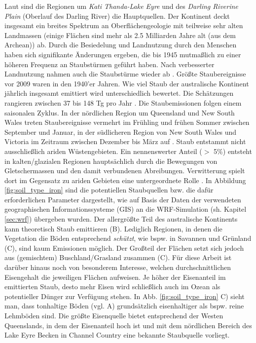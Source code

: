 \documentclass[12pt,a4paper,onecolumn,headheight=30pt]{scrartcl}
\begin{document}
Laut \citet{Deckker.2019} sind die Regionen um \textit{Kati Thanda-Lake Eyre} und des \textit{Darling Riverine Plain} (Oberlauf des Darling River) die Hauptquellen. Der Kontinent deckt insgesamt ein breites Spektrum an Oberflächengeologie mit teilweise sehr alten Landmassen (einige Flächen sind mehr als 2.5 Milliarden Jahre alt (aus dem Archean)) ab. Durch die Besiedelung und Landnutzung durch den Menschen haben sich signifikante Änderungen ergeben, die bis 1945 mutmaßlich zu einer höheren Frequenz an Staubstürmen geführt haben. Nach verbesserter Landnutzung nahmen auch die Staubstürme wieder ab \citep{Deckker.2019}. Größte Staubereignisse vor 2009 waren in den 1940'er Jahren. Wie viel Staub der australische Kontinent jährlich insgesamt emittiert wird unterschiedlich bewertet. Die Schätzungen rangieren zwischen 37 bis 148 Tg pro Jahr \citep{Shao.2011}. Die Staubemissionen folgen einem saisonalen Zyklus. In der nördlichen Region um Queensland und New South Wales treten Staubereignisse vermehrt im Frühling und frühen Sommer zwischen September und Januar, in der südlicheren Region von New South Wales und Victoria im Zeitraum zwischen Dezember bis März auf \citep{Deckker.2019}. Staub entstammt nicht ausschließlich ariden Wüstengebieten. Ein nennenswerter Anteil ($>$ 5\%) entsteht in kalten/glazialen Regionen hauptsächlich durch die Bewegungen von Gletschermassen und den damit verbundenen Abreibungen. Verwitterung spielt dort im Gegensatz zu ariden Gebieten eine untergeordnete Rolle \citep{Marx.2018}. In Abbildung \ref{fig:soil_type_iron} sind die potentiellen Staubquellen bzw. die dafür erforderlichen Parameter dargestellt, wie auf Basis der Daten der verwendeten geographischen Informationssysteme (GIS) an die WRF-Simulation (sh. Kapitel \ref{sec:wrf}) übergeben wurden. Der allergrößte Teil des australische Kontinents kann theoretisch Staub emittieren (B). Lediglich Regionen, in denen die Vegetation die Böden entsprechend \textit{schützt}, wie bspw. in Savannen und Grünland (C), sind kaum Emissionen möglich. Der Großteil der Flächen setzt sich jedoch aus (gemischtem) Buschland/Grasland zusammen (C). Für diese Arbeit ist darüber hinaus noch von besonderem Interesse, welchen durchschnittlichen Eisengehalt die jeweiligen Flächen aufweisen. Je höher der Eisenanteil im emittierten Staub, desto mehr Eisen wird schließlich auch im Ozean als potentieller Dünger zur Verfügung stehen. In Abb. \ref{fig:soil_type_iron} C) sieht man, dass tonhaltige Böden (vgl. A) grundsätzlich eisenhaltiger als bspw. reine Lehmböden sind. Die größte Eisenquelle bietet entsprechend der Westen Queenslands, in dem der Eisenanteil hoch ist und mit dem nördlichen Bereich des Lake Eyre Becken in Channel Country eine bekannte Staubquelle vorliegt.
\end{document}
